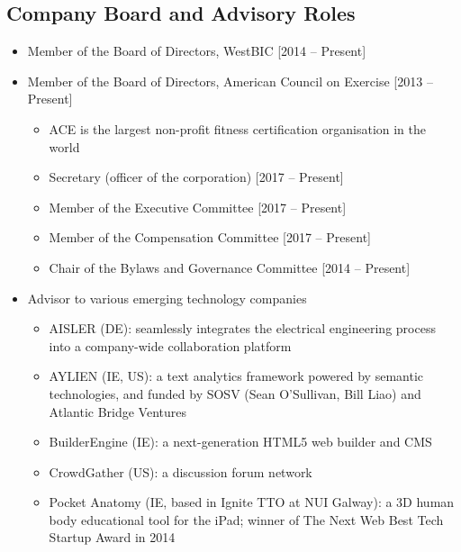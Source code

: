 \documentclass[10pt,a4paper]{res} %
\begin{document}
\begin{resume}
\subsection*{Company Board and Advisory Roles}

\begin{itemize} \itemsep -2pt
\item Member of the Board of Directors, WestBIC [2014 -- Present]
\item Member of the Board of Directors, American Council on Exercise [2013 -- Present]
\begin{itemize} \itemsep -2pt
\item ACE is the largest non-profit fitness certification organisation in the world
\item Secretary (officer of the corporation) [2017 -- Present]
\item Member of the Executive Committee [2017 -- Present]
\item Member of the Compensation Committee [2017 -- Present]
\item Chair of the Bylaws and Governance Committee [2014 -- Present]
\end{itemize}
\item Advisor to various emerging technology companies
\begin{itemize} \itemsep -2pt
\item AISLER (DE): seamlessly integrates the electrical engineering process into a company-wide collaboration platform
\item AYLIEN (IE, US): a text analytics framework powered by semantic technologies, and funded by SOSV (Sean O'Sullivan, Bill Liao) and Atlantic Bridge Ventures
\item BuilderEngine (IE): a next-generation HTML5 web builder and CMS
\item CrowdGather (US): a discussion forum network
\item Pocket Anatomy (IE, based in Ignite TTO at NUI Galway): a 3D human body educational tool for the iPad; winner of The Next Web Best Tech Startup Award in 2014
\end{itemize}
\end{itemize}


\vspace{0.2in} %



\end{resume}
\end{document}
